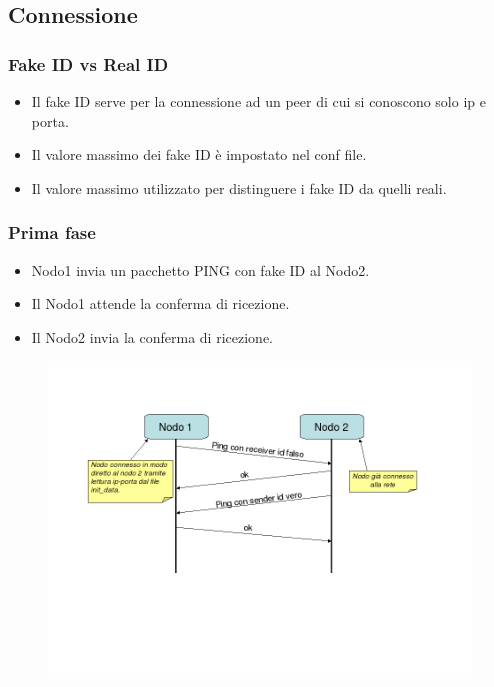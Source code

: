 \documentclass[a4paper,italian,12pt]{beamer}
\begin{document}
		\subsection{Connessione}
			\begin{frame}
				\frametitle{Fake ID vs Real ID}
				\begin{itemize}
					\item Il fake ID serve per la connessione ad un peer di cui si conoscono solo ip e porta.
					\item Il valore massimo dei fake ID è impostato nel conf file.
					\item Il valore massimo utilizzato per distinguere i fake ID da quelli reali.
				\end{itemize}
			\end{frame}
			\begin{frame}
				\frametitle{Prima fase}
				\begin{itemize}
					\item Nodo1 invia un pacchetto PING con fake ID al Nodo2.
					\item Il Nodo1 attende la conferma di ricezione.
					\item Il Nodo2 invia la conferma di ricezione.
				\end{itemize}
				\begin{figure}[H]
					\begin{center}
						\includegraphics[scale=0.3]{etc/Bootstrap.png}
					\end{center}
				\end{figure}
			\end{frame}
\end{document}
